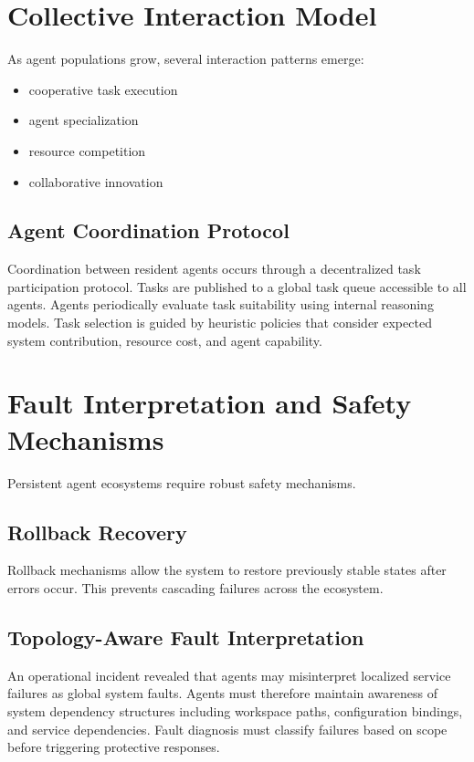 \documentclass[11pt]{article}
\begin{document}
\section{Collective Interaction Model}
As agent populations grow, several interaction patterns emerge:
\begin{itemize}[leftmargin=1.5em]
\item cooperative task execution
\item agent specialization
\item resource competition
\item collaborative innovation
\end{itemize}

\subsection{Agent Coordination Protocol}
Coordination between resident agents occurs through a decentralized task participation protocol. Tasks are published to a global task queue accessible to all agents. Agents periodically evaluate task suitability using internal reasoning models. Task selection is guided by heuristic policies that consider expected system contribution, resource cost, and agent capability.

\section{Fault Interpretation and Safety Mechanisms}
Persistent agent ecosystems require robust safety mechanisms.

\subsection{Rollback Recovery}
Rollback mechanisms allow the system to restore previously stable states after errors occur. This prevents cascading failures across the ecosystem.

\subsection{Topology-Aware Fault Interpretation}
An operational incident revealed that agents may misinterpret localized service failures as global system faults. Agents must therefore maintain awareness of system dependency structures including workspace paths, configuration bindings, and service dependencies. Fault diagnosis must classify failures based on scope before triggering protective responses.
\end{document}
